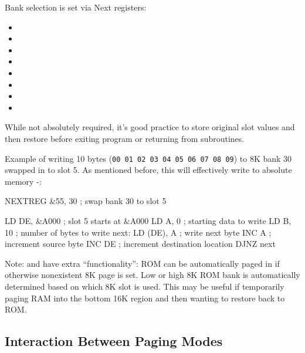 Bank selection is set via Next registers:

\begin{itemize}[topsep=0pt,itemsep=0pt]
	\item {}
	\item {}
	\item {}
	\item {}
	\item {}
	\item {}
	\item {}
	\item {}
\end{itemize}

While not absolutely required, it's good practice to store original slot values and then restore before exiting program or returning from subroutines.

Example of writing 10 bytes ({\tt 00 01 02 03 04 05 06 07 08 09}) to 8K bank 30 swapped in to slot 5. As mentioned before, this will effectively write to absolute memory -:

\begin{tcblisting}{}
	NEXTREG &55, 30     ; swap bank 30 to slot 5

	LD DE, &A000        ; slot 5 starts at &A000
	LD A, 0             ; starting data to write
	LD B, 10            ; number of bytes to write
next:
	LD (DE), A          ; write next byte
	INC A               ; increment source byte
	INC DE              ; increment destination location
	DJNZ next
\end{tcblisting}

Note:  and  have extra ``functionality'': ROM can be automatically paged in if otherwise nonexistent 8K page  is set. Low or high 8K ROM bank is automatically determined based on which 8K slot is used. This may be useful if temporarily paging RAM into the bottom 16K region and then wanting to restore back to ROM.


\subsection{Interaction Between Paging Modes}

